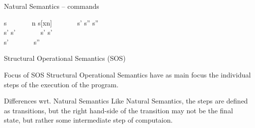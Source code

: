 \documentclass[aspectratio=169]{beamer}
\begin{document}
\begin{slide}{Natural Semantics -- commands}
\small 
\centering
\newcommand{\msep}{~~~~~~}

%
  {\shrk}{ \leadsto s}
\msep %
%
  {\alert{\leadsto n}}%
  { \leadsto s[x\mapsto n]}
\msep %
%
  {\leadsto s' \quad {}\leadsto s''}%
  { \leadsto s''}
\\[5mm] %
%
  {\alert{\leadsto {}} \quad {}\leadsto s'}%
  { \leadsto s'}
\msep %
%
  {\alert{\leadsto {}} \quad {}\leadsto s'}%
  { \leadsto s'}
\\[5mm] %
%
  {\alert{\leadsto {}}}%
  { \leadsto s'}
\msep %
%
         { \leadsto s''}
\end{slide}

\begin{slide}{Structural Operational Semantics (SOS)}
\begin{block}{Focus of SOS}
Structural Operational Semantics have as main focus the individual steps of the execution of the program.
\end{block}

\begin{block}{Differences wrt. Natural Semantics}
Like Natural Semantics, the steps are defined as transitions, but the right hand-side of the transition may not be the final state, but rather some intermediate step of computaion.
\end{block}
\end{slide}
\end{document}
